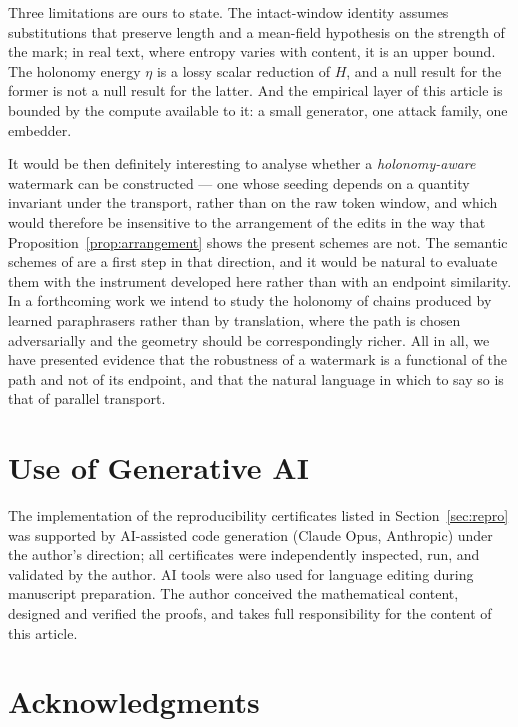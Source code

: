 \documentclass[11pt,a4paper]{article}
\theoremstyle{plain}
\theoremstyle{definition}
\numberwithin{equation}{section}
\begin{document}
Three limitations are ours to state. The intact-window identity assumes
substitutions that preserve length and a mean-field hypothesis on the
strength of the mark; in real text, where entropy varies with content,
it is an upper bound. The holonomy energy $\eta$ is a lossy scalar
reduction of $H$, and a null result for the former is not a null result
for the latter. And the empirical layer of this article is bounded by
the compute available to it: a small generator, one attack family,
one embedder.

It would be then definitely interesting to analyse whether a
\emph{holonomy-aware} watermark can be constructed --- one whose seeding
depends on a quantity invariant under the transport, rather than on the
raw token window, and which would therefore be insensitive to the
arrangement of the edits in the way that Proposition~\ref{prop:arrangement}
shows the present schemes are not. The semantic schemes of
\cite{Hou24a} are a first step in that direction, and it would be
natural to evaluate them with the instrument developed here rather than
with an endpoint similarity. In a forthcoming work we intend to study
the holonomy of chains produced by learned paraphrasers rather than by
translation, where the path is chosen adversarially and the geometry
should be correspondingly richer. All in all, we have presented evidence
that the robustness of a watermark is a functional of the path and not
of its endpoint, and that the natural language in which to say so is
that of parallel transport.

\section*{Use of Generative AI}

The implementation of the reproducibility certificates listed in
Section~\ref{sec:repro} was supported by AI-assisted code generation
(Claude Opus, Anthropic) under the author's direction; all certificates
were independently inspected, run, and validated by the author. AI tools
were also used for language editing during manuscript preparation. The
author conceived the mathematical content, designed and verified the
proofs, and takes full responsibility for the content of this article.

\section*{Acknowledgments}
\end{document}
